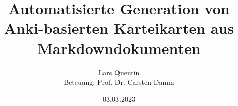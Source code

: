 \title{Automatisierte Generation von Anki-basierten Karteikarten aus Markdowndokumenten}
\author{Lars Quentin\\Beteuung: Prof. Dr. Carsten Damm}
\date{03.03.2023}
